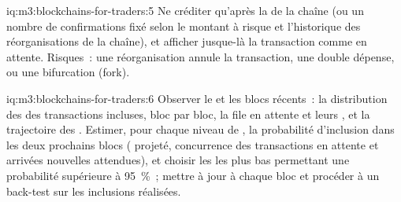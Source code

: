 \begin{solution}{iq:m3:blockchains-for-traders:5}
Ne créditer qu'après la  de la chaîne (ou un nombre de confirmations fixé selon le montant à risque et l'historique des réorganisations de la
chaîne), et afficher jusque-là la transaction comme en attente. Risques~: une réorganisation annule la transaction, une double dépense, ou une
bifurcation (fork).
\end{solution}

\begin{solution}{iq:m3:blockchains-for-traders:6}
Observer le  et les blocs récents~: la distribution des  des transactions incluses, bloc par bloc, la file en
attente et leurs , et la trajectoire des . Estimer, pour chaque niveau de , la probabilité d'inclusion dans les deux
prochains blocs ( projeté, concurrence des transactions en attente et arrivées nouvelles attendues), et choisir les
 les plus bas permettant une probabilité supérieure à 95~\%~; mettre à jour à chaque bloc et procéder à un back-test sur les inclusions réalisées.
\end{solution}
